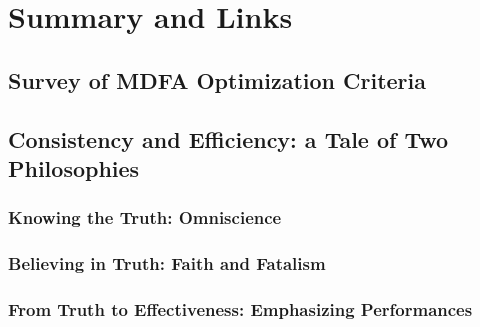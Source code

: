 \documentclass[a4paper]{book}
\begin{document}





\chapter{Summary and Links}

\section{Survey of MDFA Optimization Criteria}

\section{Consistency and Efficiency: a Tale of Two Philosophies}

\subsection{Knowing the Truth: Omniscience}

\subsection{Believing in Truth: Faith and Fatalism}

\subsection{From Truth to Effectiveness: Emphasizing Performances}





\end{document}
